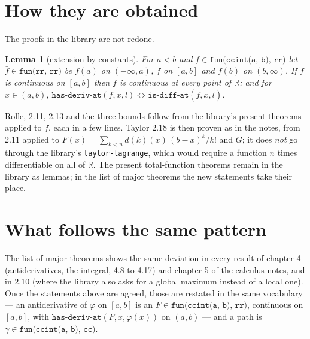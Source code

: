 \documentclass[11pt]{article}
\newtheorem{lem}[thm]{Lemma}
\theoremstyle{definition}
\newcommand{\vnb}[1]{\texttt{#1}}
\begin{document}
\section{How they are obtained}

The proofs in the library are not redone.

\begin{lem}[extension by constants]
For $a < b$ and $f \in \vnb{fun(ccint(a, b), rr)}$ let $\bar f \in \vnb{fun(rr, rr)}$ be $f(a)$ on
$(-\infty, a)$, $f$ on $[a,b]$ and $f(b)$ on $(b, \infty)$. If $f$ is continuous on $[a,b]$ then
$\bar f$ is continuous at every point of $\mathbb{R}$; and for $x \in (a,b)$,
$\vnb{has-deriv-at}(f, x, l) \iff \vnb{is-diff-at}(\bar f, x, l)$.
\end{lem}

Rolle, 2.11, 2.13 and the three bounds follow from the library's present theorems applied to
$\bar f$, each in a few lines. Taylor 2.18 is then proven as in the notes, from 2.11 applied to
$F(x) = \sum_{k<n} d(k)(x)\,(b-x)^k/k!$ and $G$; it does \emph{not} go through the library's
\vnb{taylor-lagrange}, which would require a function $n$ times differentiable on all of
$\mathbb{R}$. The present total-function theorems remain in the library as lemmas; in the list of
major theorems the new statements take their place.

\section{What follows the same pattern}

The list of major theorems shows the same deviation in every result of chapter 4 (antiderivatives,
the integral, 4.8 to 4.17) and chapter 5 of the calculus notes, and in 2.10 (where the library also
asks for a global maximum instead of a local one). Once the statements above are agreed, those are
restated in the same vocabulary --- an antiderivative of $\varphi$ on $[a,b]$ is an
$F \in \vnb{fun(ccint(a, b), rr)}$, continuous on $[a,b]$, with
$\vnb{has-deriv-at}(F, x, \varphi(x))$ on $(a,b)$ --- and a path is
$\gamma \in \vnb{fun(ccint(a, b), cc)}$.
\end{document}
